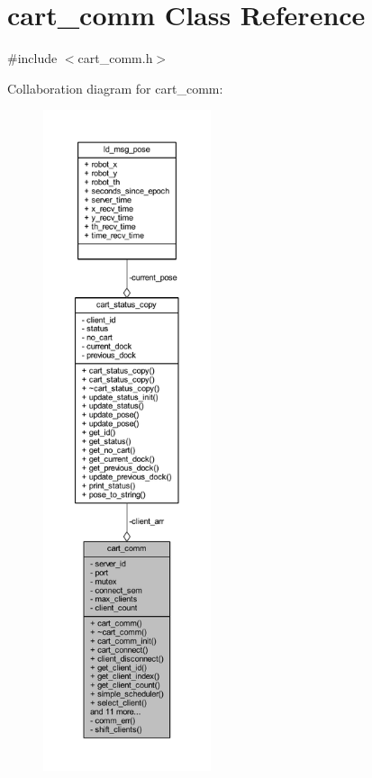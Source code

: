 \hypertarget{classcart__comm}{}\section{cart\+\_\+comm Class Reference}
\label{classcart__comm}


{\ttfamily \#include $<$cart\+\_\+comm.\+h$>$}



Collaboration diagram for cart\+\_\+comm\+:\nopagebreak
\begin{figure}[H]
\begin{center}
\leavevmode
\includegraphics[height=550pt]{classcart__comm__coll__graph}
\end{center}
\end{figure}

